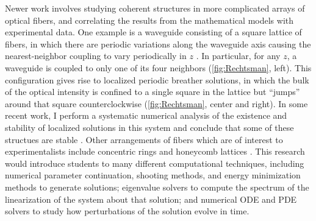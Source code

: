 \documentclass[12pt,reqno,oneside,hidelinks]{article}
\begin{document}
Newer work involves studying coherent structures in more complicated arrays of optical fibers, and correlating the results from the mathematical models with experimental data. One example is a waveguide consisting of a square lattice of fibers, in which there are periodic variations along the waveguide axis causing the nearest-neighbor coupling to vary periodically in $z$ \cite{Mukherjee2020}. In particular, for any $z$, a waveguide is coupled to only one of its four neighbors (\cref{fig:Rechtsman}, left). This configuration gives rise to localized periodic breather solutions, in which the bulk of the optical intensity is confined to a single square in the lattice but ``jumps'' around that square counterclockwise (\cref{fig:Rechtsman}, center and right). In some recent work, I perform a systematic numerical analysis of the existence and stability of localized solutions in this system and conclude that some of these structues are stable \cite{parker2021Floquet}.
Other arrangements of fibers which are of interest to experimentalists include concentric rings and honeycomb lattices \cite{Lumer2013}. This research would introduce students to many different computational techniques, including numerical parameter continuation, shooting methods, and energy minimization methods to generate solutions; eigenvalue solvers to compute the spectrum of the linearization of the system about that solution; and numerical ODE and PDE solvers to study how perturbations of the solution evolve in time. 
\end{document}
